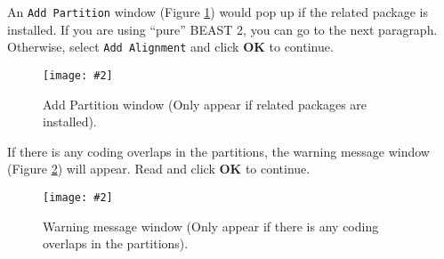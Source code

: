 \documentclass[12pt]{article}
\newcommand{\includeimage}[2][]{%
\texttt{[image: \#2]}
}
\begin{document}
%
%
%

%
%

An \texttt{Add Partition} window (Figure \ref{fig:addPartition}) would pop up if the related package is installed. If you are using ``pure'' BEAST 2, you can go to the next paragraph.    
Otherwise, select \texttt{Add Alignment} and click \textbf{OK} to continue.

\begin{figure}
\centering	
\includeimage[width=0.5\textwidth]{figures/AddPartition}
\caption{Add Partition window (Only appear if related packages are installed).}
\label{fig:addPartition}
\end{figure}

If there is any coding overlaps in the partitions, the warning message window (Figure \ref{fig:warning}) will appear. Read and click \textbf{OK} to continue.

\begin{figure}	
\centering	
\includeimage[width=0.9\textwidth]{figures/warning}
\caption{Warning message window (Only appear if there is any coding overlaps in the partitions).}
\label{fig:warning}
\end{figure}
\end{document}
